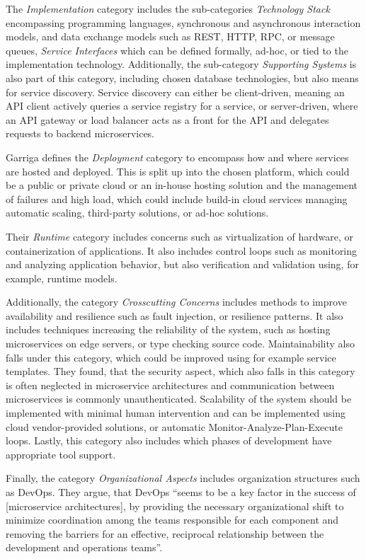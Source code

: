 The \textit{Implementation} category includes the sub-categories \textit{Technology Stack} encompassing programming languages, synchronous and asynchronous interaction models, and data exchange models such as \ac{REST}, \ac{HTTP}, \ac{RPC}, or message queues, \textit{Service Interfaces} which can be defined formally, ad-hoc, or tied to the implementation technology.
Additionally, the sub-category \textit{Supporting Systems} is also part of this category, including chosen database technologies, but also means for service discovery.
Service discovery can either be client-driven, meaning an \ac{API} client actively queries a service registry for a service, or server-driven, where an \ac{API} gateway or load balancer acts as a front for the \ac{API} and delegates requests to backend microservices.

Garriga defines the \textit{Deployment} category to encompass how and where services are hosted and deployed.
This is split up into the chosen platform, which could be a public or private cloud or an in-house hosting solution and the management of failures and high load, which could include build-in cloud services managing automatic scaling, third-party solutions, or ad-hoc solutions.

Their \textit{Runtime} category includes concerns such as virtualization of hardware, or containerization of applications.
It also includes control loops such as monitoring and analyzing application behavior, but also verification and validation using, for example, runtime models.

Additionally, the category \textit{Crosscutting Concerns} includes methods to improve availability and resilience such as fault injection, or resilience patterns.
It also includes techniques increasing the reliability of the system, such as hosting microservices on edge servers, or type checking source code.
Maintainability also falls under this category, which could be improved using for example service templates.
They found, that the security aspect, which also falls in this category is often neglected in microservice architectures and communication between microservices is commonly unauthenticated.
Scalability of the system should be implemented with minimal human intervention and can be implemented using cloud vendor-provided solutions, or automatic Monitor-Analyze-Plan-Execute loops.
Lastly, this category also includes which phases of development have appropriate tool support.

Finally, the category \textit{Organizational Aspects} includes organization structures such as {DevOps}.
They argue, that DevOps ``seems to be a key factor in the success of [microservice architectures], by providing the necessary organizational shift to minimize coordination among the teams responsible for each component and removing the barriers for an effective, reciprocal relationship between the development and operations teams''.

